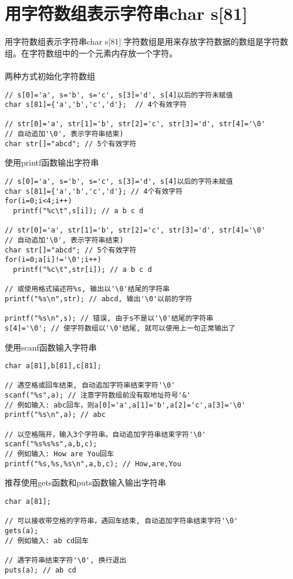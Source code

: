 \section{用字符数组表示字符串char s[81]}

\begin{frame}{用字符数组表示字符串char s[81]}
字符数组是用来存放字符数据的数组是字符数组。在字符数组中的一个元素内存放一个字符。\\
~\\
两种方式初始化字符数组
\begin{lstlisting}
// s[0]='a', s='b', s='c', s[3]='d', s[4]以后的字符未赋值
char s[81]={'a','b','c','d'};  // 4个有效字符

// str[0]='a', str[1]='b', str[2]='c', str[3]='d', str[4]='\0'
// 自动追加'\0', 表示字符串结束)
char str[]="abcd"; // 5个有效字符
\end{lstlisting}
\end{frame}

\begin{frame}{使用printf函数输出字符串}
\vspace{-0.3cm}
\begin{lstlisting}
// s[0]='a', s='b', s='c', s[3]='d', s[4]以后的字符未赋值
char s[81]={'a','b','c','d'}; // 4个有效字符
for(i=0;i<4;i++)
  printf("%c\t",s[i]); // a b c d

// str[0]='a', str[1]='b', str[2]='c', str[3]='d', str[4]='\0'
// 自动追加'\0', 表示字符串结束)
char str[]="abcd"; // 5个有效字符
for(i=0;a[i]!='\0';i++)
  printf("%c\t",str[i]); // a b c d

// 或使用格式描述符%s, 输出以'\0'结尾的字符串
printf("%s\n",str); // abcd, 输出'\0'以前的字符

printf("%s\n",s); // 错误, 由于s不是以'\0'结尾的字符串
s[4]='\0'; // 使字符数组以'\0'结尾, 就可以使用上一句正常输出了
\end{lstlisting}
\end{frame}

\begin{frame}{使用scanf函数输入字符串}
\begin{lstlisting}
char a[81],b[81],c[81];

// 遇空格或回车结束, 自动追加字符串结束字符'\0'
scanf("%s",a); // 注意字符数组前没有取地址符号'&'
// 例如输入: abc回车，则a[0]='a',a[1]='b',a[2]='c',a[3]='\0'
printf("%s\n",a); // abc

// 以空格隔开，输入3个字符串。自动追加字符串结束字符'\0'
scanf("%s%s%s",a,b,c); 
// 例如输入: How are You回车
printf("%s,%s,%s\n",a,b,c); // How,are,You
\end{lstlisting}
\end{frame}

\begin{frame}{推荐使用gets函数和puts函数输入输出字符串}
\begin{lstlisting}
char a[81];

// 可以接收带空格的字符串，遇回车结束, 自动追加字符串结束字符'\0'
gets(a);
// 例如输入: ab cd回车

// 遇字符串结束字符'\0', 换行退出
puts(a); // ab cd
\end{lstlisting}
\end{frame}




